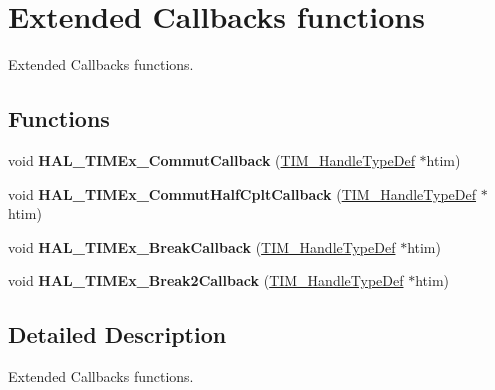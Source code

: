 \hypertarget{group___t_i_m_ex___exported___functions___group6}{}\section{Extended Callbacks functions}
\label{group___t_i_m_ex___exported___functions___group6}


Extended Callbacks functions.  


\subsection*{Functions}
\begin{DoxyCompactItemize}
\item 
\mbox{\label{group___t_i_m_ex___exported___functions___group6_gaa4189b31d2c006ee33f55f8c6eeba930}} 
void {\bfseries H\+A\+L\+\_\+\+T\+I\+M\+Ex\+\_\+\+Commut\+Callback} (\mbox{\hyperlink{struct_t_i_m___handle_type_def}{T\+I\+M\+\_\+\+Handle\+Type\+Def}} $\ast$htim)
\item 
\mbox{\label{group___t_i_m_ex___exported___functions___group6_ga971ecdc215921771e56ed2c4944dc0b1}} 
void {\bfseries H\+A\+L\+\_\+\+T\+I\+M\+Ex\+\_\+\+Commut\+Half\+Cplt\+Callback} (\mbox{\hyperlink{struct_t_i_m___handle_type_def}{T\+I\+M\+\_\+\+Handle\+Type\+Def}} $\ast$htim)
\item 
\mbox{\label{group___t_i_m_ex___exported___functions___group6_ga2d868a55ca7c62c4a5ef85dec514402c}} 
void {\bfseries H\+A\+L\+\_\+\+T\+I\+M\+Ex\+\_\+\+Break\+Callback} (\mbox{\hyperlink{struct_t_i_m___handle_type_def}{T\+I\+M\+\_\+\+Handle\+Type\+Def}} $\ast$htim)
\item 
\mbox{\label{group___t_i_m_ex___exported___functions___group6_ga1efa3cf97c2c2a7b21a25b55ce2c67fa}} 
void {\bfseries H\+A\+L\+\_\+\+T\+I\+M\+Ex\+\_\+\+Break2\+Callback} (\mbox{\hyperlink{struct_t_i_m___handle_type_def}{T\+I\+M\+\_\+\+Handle\+Type\+Def}} $\ast$htim)
\end{DoxyCompactItemize}


\subsection{Detailed Description}
Extended Callbacks functions. 


